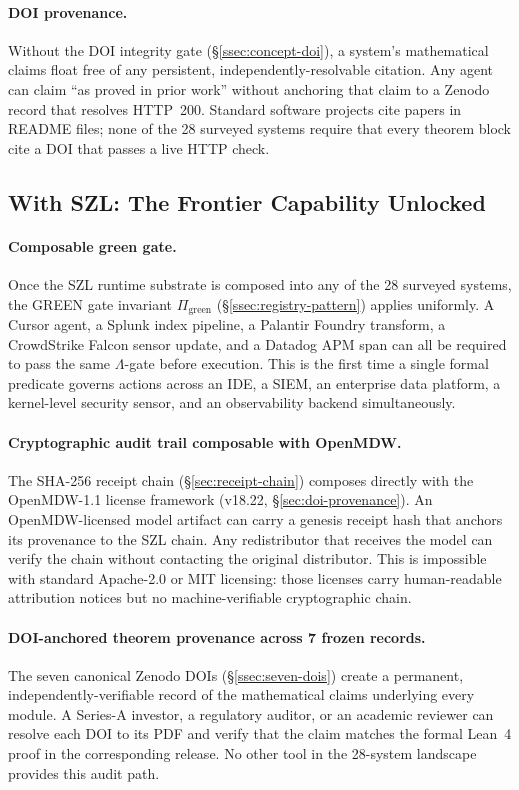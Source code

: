 \paragraph{DOI provenance.}
Without the DOI integrity gate (\S\ref{ssec:concept-doi}), a system's
mathematical claims float free of any persistent, independently-resolvable
citation.  Any agent can claim ``as proved in prior work'' without anchoring
that claim to a Zenodo record that resolves HTTP~200.  Standard software
projects cite papers in README files; none of the 28 surveyed systems
require that every theorem block cite a DOI that passes a live HTTP check.

\subsection{With SZL: The Frontier Capability Unlocked}
\label{ssec:with-szl-runtime}

\paragraph{Composable green gate.}
Once the SZL runtime substrate is composed into any of the 28 surveyed
systems, the GREEN gate invariant $\Pi_{\mathrm{green}}$
(\S\ref{ssec:registry-pattern}) applies uniformly.  A Cursor agent, a
Splunk index pipeline, a Palantir Foundry transform, a CrowdStrike Falcon
sensor update, and a Datadog APM span can all be required to pass the same
$\Lambda$-gate before execution.  This is the first time a single formal
predicate governs actions across an IDE, a SIEM, an enterprise data platform,
a kernel-level security sensor, and an observability backend simultaneously.

\paragraph{Cryptographic audit trail composable with OpenMDW.}
The SHA-256 receipt chain (\S\ref{sec:receipt-chain}) composes directly with
the OpenMDW-1.1 license framework (v18.22, \S\ref{sec:doi-provenance}).
An OpenMDW-licensed model artifact can carry a genesis receipt hash that
anchors its provenance to the SZL chain.  Any redistributor that receives
the model can verify the chain without contacting the original distributor.
This is impossible with standard Apache-2.0 or MIT licensing: those licenses
carry human-readable attribution notices but no machine-verifiable
cryptographic chain.

\paragraph{DOI-anchored theorem provenance across 7 frozen records.}
The seven canonical Zenodo DOIs (\S\ref{ssec:seven-dois}) create a
permanent, independently-verifiable record of the mathematical claims
underlying every module.  A Series-A investor, a regulatory auditor, or an
academic reviewer can resolve each DOI to its PDF and verify that the
claim matches the formal Lean~4 proof in the corresponding release.  No
other tool in the 28-system landscape provides this audit path.


